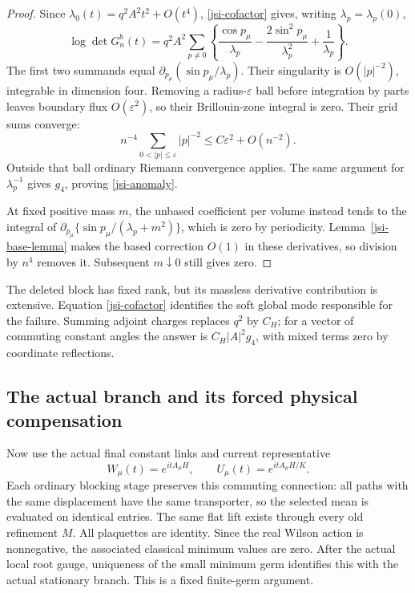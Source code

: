 \documentclass[11pt]{article}
\theoremstyle{remark}
\begin{document}
\begin{proof}
Since \(\lambda_0(t)=q^2A^2t^2+O(t^4)\),
\eqref{jsi-cofactor} gives, writing \(\lambda_p=\lambda_p(0)\),
\begin{equation}
 [t^2]\log\det G_n^b(t)
   =q^2A^2\sum_{p\ne0}
    \left\{\frac{\cos p_\mu}{\lambda_p}
       -\frac{2\sin^2p_\mu}{\lambda_p^2}
       +\frac1{\lambda_p}\right\}.
 \label{jsi-cofactor-jet}
\end{equation}
The first two summands equal
\(\partial_{p_\mu}(\sin p_\mu/\lambda_p)\).
Their singularity is \(O(|p|^{-2})\), integrable in dimension
four. Removing a radius-\(\varepsilon\) ball before integration
by parts leaves boundary flux \(O(\varepsilon^2)\), so their
Brillouin-zone integral is zero. Their grid sums converge:
\begin{equation}
 n^{-4}\sum_{0<|p|\le\varepsilon}|p|^{-2}
                       \le C\varepsilon^2+O(n^{-2}).
 \label{jsi-grid-bound}
\end{equation}
Outside that ball ordinary Riemann convergence applies.
The same argument for \(\lambda_p^{-1}\) gives \(g_4\),
proving \eqref{jsi-anomaly}.

At fixed positive mass \(m\), the unbased coefficient per volume
instead tends to the integral of
\(\partial_{p_\mu}\{\sin p_\mu/(\lambda_p+m^2)\}\),
which is zero by periodicity. Lemma~\ref{jsi-base-lemma}
makes the based correction \(O(1)\) in these derivatives,
so division by \(n^4\) removes it. Subsequent \(m\downarrow0\)
still gives zero.
\end{proof}

The deleted block has fixed rank, but its massless derivative
contribution is extensive. Equation \eqref{jsi-cofactor} identifies
the soft global mode responsible for the failure. Summing
adjoint charges replaces \(q^2\) by \(C_H\); for a vector of
commuting constant angles the answer is \(C_H|A|^2g_4\),
with mixed terms zero by coordinate reflections.

\subsection{The actual branch and its forced physical compensation}
\label{jsi-actual-section}

Now use the actual final constant links and current representative
\begin{equation}
 W_\mu(t)=e^{itA_\mu H},\qquad
 U_\mu(t)=e^{itA_\mu H/K}.
 \label{jsi-flat-branch}
\end{equation}
Each ordinary blocking stage preserves this commuting connection:
all paths with the same displacement have the same transporter,
so the selected mean is evaluated on identical entries.
The same flat lift exists through every old refinement \(M\).
All plaquettes are identity. Since the real Wilson action is
nonnegative, the associated classical minimum values are zero.
After the actual local root gauge, uniqueness of the small
minimum germ identifies this with the actual stationary branch.
This is a fixed finite-germ argument.
\end{document}
